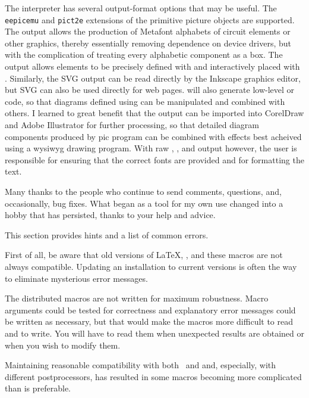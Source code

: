 The \dpic interpreter has several output-format options that may be
useful.  The {\tt eepicemu} and {\tt pict2e} extensions of the
primitive \latex picture objects are supported.  The \mfpic output
allows the production of Metafont alphabets of circuit elements or
other graphics, thereby essentially removing dependence on device
drivers, but with the complication of treating every alphabetic
component as a \tex box.  The \xfig output allows elements to be
precisely defined with \dpic  and interactively placed with \xfig.
Similarly, the SVG output can be read directly by the Inkscape graphics
editor, but SVG can also be used directly for web pages.
\Dpic will also generate low-level \MetaPost or \Postscript code, so
that diagrams defined using \pic can be manipulated and combined with
others.
I learned to great benefit that the \Postscript output can be imported into
CorelDraw and Adobe Illustrator for further processing,
so that detailed diagram components produced by pic program can be combined
with effects best acheived using a wysiwyg drawing program.
With raw \Postscript, \PDF, and \SVG output however, the user is
responsible for ensuring that the correct fonts are provided and for
formatting the text.

Many thanks to the people who continue to send comments, questions,
and, occasionally, bug fixes. What began as a tool for my own use changed
into a hobby that has persisted, thanks to your help and advice.

This section provides hints and a list of common errors.

First of all, be aware that old versions of \LaTeX, \dpic, and these
macros are not always compatible.  Updating an installation to current
versions is often the way to eliminate mysterious error messages.

The distributed macros are not written for maximum robustness.
Macro arguments could be tested for correctness and
explanatory error messages could be written as necessary, but that
would make the macros more difficult to read and to write.  You will
have to read them when unexpected results are obtained or when you wish
to modify them.

Maintaining reasonable compatibility with both \gpic\ and \dpic
and, especially, with different postprocessors, has
resulted in some macros becoming more complicated than is preferable.

